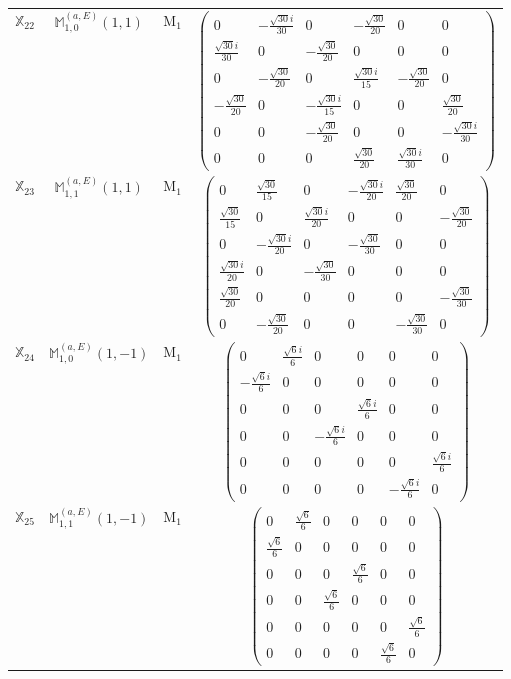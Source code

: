 \documentclass[fleqn,10pt,landscape]{article}
\begin{document}
\begin{itemize}
\begin{center}
\begin{longtable}{c|c|c|c}
$ \mathbb{X}_{22} $ & $\mathbb{M}_{1,0}^{(a,E)}(1,1)$ & M$_{1}$ & $\begin{pmatrix} 0 & - \frac{\sqrt{30} i}{30} & 0 & - \frac{\sqrt{30}}{20} & 0 & 0 \\ \frac{\sqrt{30} i}{30} & 0 & - \frac{\sqrt{30}}{20} & 0 & 0 & 0 \\ 0 & - \frac{\sqrt{30}}{20} & 0 & \frac{\sqrt{30} i}{15} & - \frac{\sqrt{30}}{20} & 0 \\ - \frac{\sqrt{30}}{20} & 0 & - \frac{\sqrt{30} i}{15} & 0 & 0 & \frac{\sqrt{30}}{20} \\ 0 & 0 & - \frac{\sqrt{30}}{20} & 0 & 0 & - \frac{\sqrt{30} i}{30} \\ 0 & 0 & 0 & \frac{\sqrt{30}}{20} & \frac{\sqrt{30} i}{30} & 0 \end{pmatrix}$ \\
$ \mathbb{X}_{23} $ & $\mathbb{M}_{1,1}^{(a,E)}(1,1)$ & M$_{1}$ & $\begin{pmatrix} 0 & \frac{\sqrt{30}}{15} & 0 & - \frac{\sqrt{30} i}{20} & \frac{\sqrt{30}}{20} & 0 \\ \frac{\sqrt{30}}{15} & 0 & \frac{\sqrt{30} i}{20} & 0 & 0 & - \frac{\sqrt{30}}{20} \\ 0 & - \frac{\sqrt{30} i}{20} & 0 & - \frac{\sqrt{30}}{30} & 0 & 0 \\ \frac{\sqrt{30} i}{20} & 0 & - \frac{\sqrt{30}}{30} & 0 & 0 & 0 \\ \frac{\sqrt{30}}{20} & 0 & 0 & 0 & 0 & - \frac{\sqrt{30}}{30} \\ 0 & - \frac{\sqrt{30}}{20} & 0 & 0 & - \frac{\sqrt{30}}{30} & 0 \end{pmatrix}$ \\
$ \mathbb{X}_{24} $ & $\mathbb{M}_{1,0}^{(a,E)}(1,-1)$ & M$_{1}$ & $\begin{pmatrix} 0 & \frac{\sqrt{6} i}{6} & 0 & 0 & 0 & 0 \\ - \frac{\sqrt{6} i}{6} & 0 & 0 & 0 & 0 & 0 \\ 0 & 0 & 0 & \frac{\sqrt{6} i}{6} & 0 & 0 \\ 0 & 0 & - \frac{\sqrt{6} i}{6} & 0 & 0 & 0 \\ 0 & 0 & 0 & 0 & 0 & \frac{\sqrt{6} i}{6} \\ 0 & 0 & 0 & 0 & - \frac{\sqrt{6} i}{6} & 0 \end{pmatrix}$ \\
$ \mathbb{X}_{25} $ & $\mathbb{M}_{1,1}^{(a,E)}(1,-1)$ & M$_{1}$ & $\begin{pmatrix} 0 & \frac{\sqrt{6}}{6} & 0 & 0 & 0 & 0 \\ \frac{\sqrt{6}}{6} & 0 & 0 & 0 & 0 & 0 \\ 0 & 0 & 0 & \frac{\sqrt{6}}{6} & 0 & 0 \\ 0 & 0 & \frac{\sqrt{6}}{6} & 0 & 0 & 0 \\ 0 & 0 & 0 & 0 & 0 & \frac{\sqrt{6}}{6} \\ 0 & 0 & 0 & 0 & \frac{\sqrt{6}}{6} & 0 \end{pmatrix}$ \\

\end{longtable}
\end{center}
\end{itemize}
\end{document}
